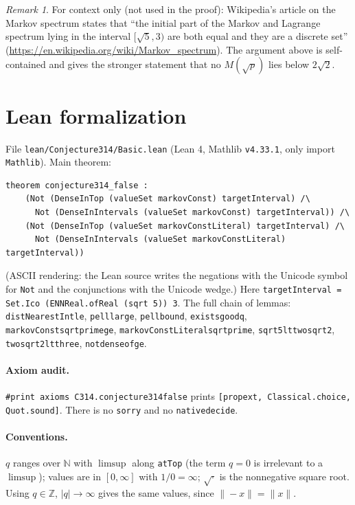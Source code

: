 \documentclass[11pt]{article}
\renewcommand{\_}{\oldus\allowbreak}
\theoremstyle{definition}
\theoremstyle{remark}
\newtheorem{remark}[theorem]{Remark}
\begin{document}
\begin{remark}
For context only (not used in the proof): Wikipedia's article on the Markov spectrum states that
``the initial part of the Markov and Lagrange spectrum lying in the interval $[\sqrt5, 3)$ are both
equal and they are a discrete set''
(\url{https://en.wikipedia.org/wiki/Markov_spectrum}). The argument above is self-contained and
gives the stronger statement that no $M(\sqrt p)$ lies below $2\sqrt2$.
\end{remark}

\section{Lean formalization}
File \texttt{lean/Conjecture314/Basic.lean} (Lean 4, Mathlib \texttt{v4.33.1}, only import
\texttt{Mathlib}). Main theorem:
\begin{verbatim}
theorem conjecture314_false :
    (Not (DenseInTop (valueSet markovConst) targetInterval) /\
      Not (DenseInIntervals (valueSet markovConst) targetInterval)) /\
    (Not (DenseInTop (valueSet markovConstLiteral) targetInterval) /\
      Not (DenseInIntervals (valueSet markovConstLiteral) targetInterval))
\end{verbatim}
(ASCII rendering: the Lean source writes the negations with the Unicode symbol for
\texttt{Not} and the conjunctions with the Unicode wedge.)
Here \texttt{targetInterval = Set.Ico (ENNReal.ofReal (sqrt 5)) 3}. The full chain of lemmas:
\texttt{distNearestInt\_le}, \texttt{pell\_large}, \texttt{pell\_bound},
\texttt{exists\_good\_q}, \texttt{markovConst\_sqrt\_prime\_ge},
\texttt{markovConstLiteral\_sqrt\_prime}, \texttt{sqrt5\_lt\_two\_sqrt2},
\texttt{two\_sqrt2\_lt\_three}, \texttt{not\_dense\_of\_ge}.

\paragraph{Axiom audit.} \texttt{\#print axioms C314.conjecture314\_false} prints
\texttt{[propext, Classical.choice, Quot.sound]}. There is no \texttt{sorry} and no
\texttt{native\_decide}.

\paragraph{Conventions.} $q$ ranges over $\mathbb N$ with $\limsup$ along \texttt{atTop} (the term
$q=0$ is irrelevant to a $\limsup$); values are in $[0,\infty]$ with $1/0=\infty$; $\sqrt{\cdot}$ is
the nonnegative square root. Using $q\in\mathbb Z$, $|q|\to\infty$ gives the same values, since
$\|-x\|=\|x\|$.
\end{document}
